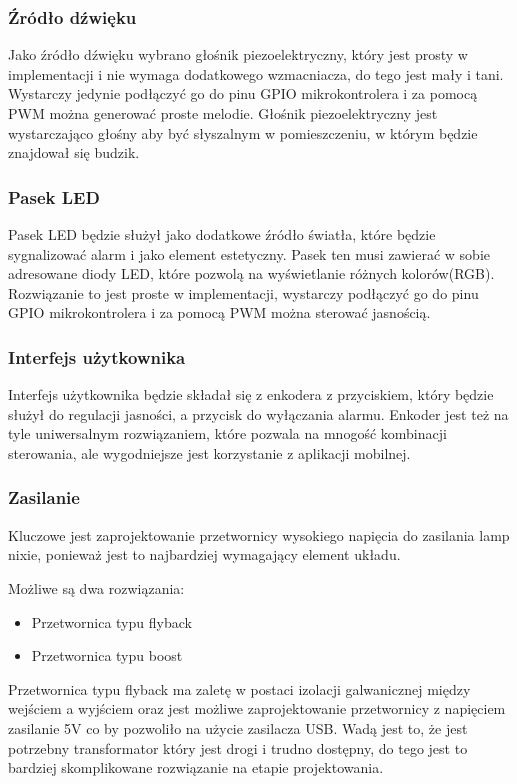\documentclass[../main.tex]{subfiles}
\begin{document}
\subsubsection{Źródło dźwięku}
Jako źródło dźwięku wybrano głośnik piezoelektryczny, który jest prosty w implementacji i nie wymaga dodatkowego wzmacniacza, do tego jest mały i tani.
Wystarczy jedynie podłączyć go do pinu GPIO mikrokontrolera i za pomocą PWM można generować proste melodie. Głośnik piezoelektryczny jest wystarczająco głośny
aby być słyszalnym w pomieszczeniu, w którym będzie znajdował się budzik.

\subsubsection{Pasek LED}
Pasek LED będzie służył jako dodatkowe źródło światła, które będzie sygnalizować alarm i jako element estetyczny. Pasek ten musi 
zawierać w sobie adresowane diody LED, które pozwolą na wyświetlanie różnych kolorów(RGB).
Rozwiązanie to jest proste w implementacji, wystarczy podłączyć go do pinu GPIO mikrokontrolera i za pomocą PWM można sterować jasnością.

\subsubsection{Interfejs użytkownika}
Interfejs użytkownika będzie składał się z enkodera z przyciskiem, który będzie służył do regulacji jasności, a przycisk do wyłączania alarmu.
Enkoder jest też na tyle uniwersalnym rozwiązaniem, które pozwala na mnogość kombinacji sterowania, ale wygodniejsze jest korzystanie z aplikacji mobilnej.

\subsubsection{Zasilanie}
Kluczowe jest zaprojektowanie przetwornicy wysokiego napięcia do zasilania lamp nixie, ponieważ jest to najbardziej wymagający element układu.

Możliwe są dwa rozwiązania:
\begin{itemize}
    \item Przetwornica typu flyback
    \item Przetwornica typu boost
\end{itemize}

Przetwornica typu flyback ma zaletę w postaci izolacji galwanicznej między wejściem a wyjściem oraz jest możliwe zaprojektowanie przetwornicy z napięciem zasilanie 5V
co by pozwoliło na użycie zasilacza USB. Wadą jest to, że jest potrzebny transformator który jest drogi i trudno dostępny, do tego jest to bardziej skomplikowane rozwiązanie na 
etapie projektowania.
\end{document}
